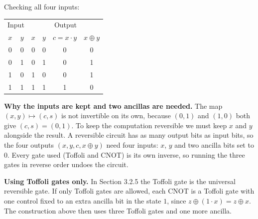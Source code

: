 Checking all four inputs:

\begin{center}
\begin{tabular}{cc|cccc}
    \multicolumn{2}{c|}{Input} & \multicolumn{4}{c}{Output} \\
    $x$ & $y$ & $x$ & $y$ & $c = x \cdot y$ & $x \oplus y$ \\
    \hline
    0 & 0 & 0 & 0 & 0 & 0 \\
    0 & 1 & 0 & 1 & 0 & 1 \\
    1 & 0 & 1 & 0 & 0 & 1 \\
    1 & 1 & 1 & 1 & 1 & 0 \\
\end{tabular}
\end{center}

\textbf{Why the inputs are kept and two ancillas are needed.} The map $(x, y) \mapsto (c, s)$ is not invertible on its own, because $(0,1)$ and $(1,0)$ both give $(c, s) = (0, 1)$. To keep the computation reversible we must keep $x$ and $y$ alongside the result. A reversible circuit has as many output bits as input bits, so the four outputs $(x, y, c, x \oplus y)$ need four inputs: $x$, $y$ and two ancilla bits set to $0$. Every gate used (Toffoli and CNOT) is its own inverse, so running the three gates in reverse order undoes the circuit.

\textbf{Using Toffoli gates only.} In Section 3.2.5 the Toffoli gate is the universal reversible gate. If only Toffoli gates are allowed, each CNOT is a Toffoli gate with one control fixed to an extra ancilla bit in the state $1$, since $z \oplus (1 \cdot x) = z \oplus x$. The construction above then uses three Toffoli gates and one more ancilla.
